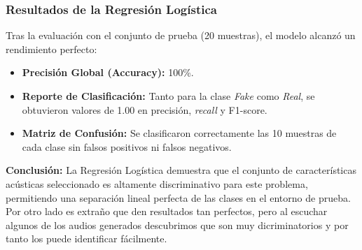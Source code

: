 \subsubsection*{Resultados de la Regresión Logística}

Tras la evaluación con el conjunto de prueba (20 muestras), el modelo alcanzó un rendimiento perfecto:
\begin{itemize}
    \item \textbf{Precisión Global (Accuracy):} 100\%.
    \item \textbf{Reporte de Clasificación:} Tanto para la clase \textit{Fake} como \textit{Real}, se obtuvieron valores de 1.00 en precisión, \textit{recall} y F1-score.
    \item \textbf{Matriz de Confusión:} Se clasificaron correctamente las 10 muestras de cada clase sin falsos positivos ni falsos negativos.
\end{itemize}
\textbf{Conclusión:} La Regresión Logística demuestra que el conjunto de características acústicas seleccionado es altamente discriminativo para este problema, permitiendo una separación lineal perfecta de las clases en el entorno de prueba. Por otro lado es extraño que den resultados tan perfectos, pero al escuchar algunos de los audios generados descubrimos que son muy dicriminatorios y por tanto los puede identificar fácilmente.
